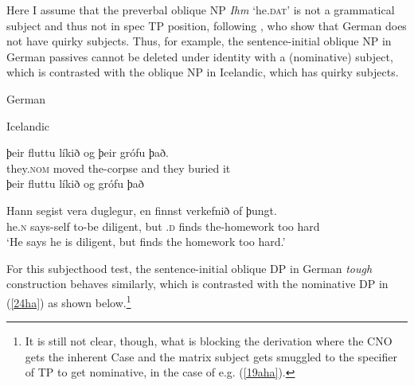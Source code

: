\documentclass[output=paper]{langscibook}
\begin{document}
Here I assume that the preverbal oblique NP \textit{Ihm} ‘he.\textsc{dat}’ is not a grammatical subject and thus not in spec TP position, following \citet{ZaenenThrainsson1985}, who show that German does not have quirky subjects. Thus, for example, the sentence-initial oblique NP in German passives cannot be deleted under identity with a (nominative) subject, which is contrasted with the oblique NP in Icelandic, which has quirky subjects.

\begin{exe}
\ex \label{21ha}German
\begin{xlist}



\end{xlist}

\ex \label{22ha}Icelandic
\begin{xlist}
\ex \label{22aha}
\gll ϸeir  fluttu  líkið og   ϸeir grófu   ϸað.\\
they.\textsc{nom} moved the-corpse and they buried it\\

\ex \label{22bha}
ϸeir fluttu líkið og \underline{\hspace{6mm}} grófu ϸað 

\ex \label{22cha}
\gll Hann segist vera duglegur, en \underline{\hspace{6mm}} finnst  verkefnið of ϸungt.\\
he.\textsc{n} says-self to-be diligent, but \underline{\hspace{6mm}}.\textsc{d} finds the-homework too hard\\
\glt `He says he is diligent, but finds the homework too hard.' \citep[453-454]{ZaenenThrainsson1985}
\end{xlist}

\end{exe}
For this subjecthood test, the sentence-initial oblique DP in German \textit{tough} construction behaves similarly, which is contrasted with the nominative DP in (\ref{24ha}) as shown below.\footnote{It is still not clear, though, what is blocking the derivation where the CNO gets the inherent Case and the matrix subject gets smuggled to the specifier of TP to get nominative, in the case of e.g. (\ref{19aha}).}
\end{document}
